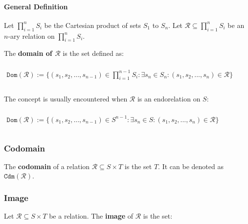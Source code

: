 \paragraph{General Definition}

Let $\displaystyle \prod_{i=1}^n S_i$ be the Cartesian product of sets
$S_1$ to $S_n$. Let
$\mathcal{R} \subseteq \displaystyle \prod_{i=1}^n S_i$ be an $n$-ary
relation on $\displaystyle \prod_{i=1}^n S_i$.

The \textbf{domain of $\mathcal{R}$} is the set defined as:

\begin{math}
  \begin{array}{c}
    \\
    \mathtt{Dom}(\mathcal{R}) := \{ (s_1, s_2, ..., s_{n-1}) \in \displaystyle \prod_{i=1}^{n-1} S_i : \exists s_n \in S_n : (s_1, s_2, ..., s_n) \in \mathcal{R} \}\\
    \\
  \end{array}
\end{math}

The concept is usually encountered when $\mathcal{R}$ is an
endorelation on $S$:

\begin{math}
  \begin{array}{c}
    \\
    \mathtt{Dom}(\mathcal{R}) := \{ (s_1, s_2, ..., s_{n-1}) \in S^{n-1} : \exists s_n \in S : (s_1, s_2, ..., s_n) \in \mathcal{R} \}\\
    \\
  \end{array}
\end{math}


\subsubsection{Codomain}
\label{sec:codomain}

The \textbf{codomain} of a relation $\mathcal{R} \subseteq S \times T$
is the set $T$. It can be denoted as $\mathtt{Cdm}(\mathcal{R})$.


\subsubsection{Image}
\label{sec:image}

Let $\mathcal{R} \subseteq S \times T$ be a relation. The
\textbf{image} of $\mathcal{R}$ is the set:

